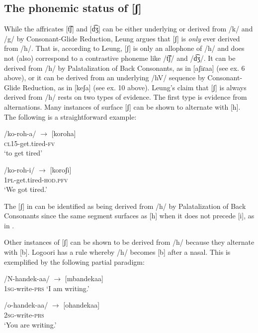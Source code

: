 \documentclass[output=paper]{langsci/langscibook}
\begin{document}
\subsection{The phonemic status of [ʃ]} %

While the affricates [t͡ʃ] and [d͡ʒ] can be either underlying or derived from /k/ and /g/ by Consonant-Glide Reduction, Leung argues that [ʃ] is \textit{only} ever derived from /h/. That is, according to Leung, [ʃ] is only an allophone of /h/ and does not (also) correspond to a contrastive phoneme like /t͡ʃ/ and /d͡ʒ/. It can be derived from /h/ by Palatalization of Back Consonants, as in [aʃiɾaa] (see ex. 6 above), or it can be derived from an underlying /hV/ sequence by Consonant-Glide Reduction, as in [keʃa] (see ex. 10 above). Leung’s claim that [ʃ] is always derived from /h/ rests on two types of evidence. The first type is evidence from alternations. Many instances of surface [ʃ] can be shown to alternate with [h]. The following is a straightforward example:


\ea\label{ex:glewwe:13}{}
   \ea\label{ex:glewwe:13a}
 /ko-roh-a/  $\rightarrow$  [koroha]\\{}
\textsc{cl15}-get.tired-\textsc{fv}\\{}
\glt ‘to get tired’ \citep[38]{Leung1991}

\ex\label{ex:glewwe:13b}{}
 /ko-roh-i/  $\rightarrow$  [koroʃi]\\{}
\textsc{1pl}-get.tired-\textsc{hod.pfv}\\{}
\glt ‘We got tired.’ \citep[38]{Leung1991}
\z
\z 

The [ʃ] in  can be identified as being derived from /h/ by Palatalization of Back Consonants since the same segment surfaces as [h] when it does not precede [i], as in . 

Other instances of [ʃ] can be shown to be derived from /h/ because they alternate with [b]. Logoori has a rule whereby /h/ becomes [b] after a nasal. This is exemplified by the following partial paradigm:

\ea\label{ex:glewwe:14}{}
   \ea\label{ex:glewwe:14a}
/N-handek-aa/  $\rightarrow$  [mbandekaa] \\{}
\textsc{1sg}-write-\textsc{prs}
\glt ‘I am writing.’

\ex\label{ex:glewwe:14b}{}
/o-handek-aa/  $\rightarrow$  [ohandekaa]\\{}
\textsc{2sg}-write-\textsc{prs}\\{}
\glt ‘You are writing.’
\end{document}
